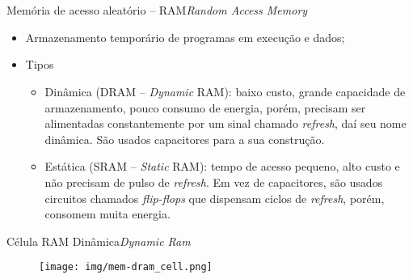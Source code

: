 \frame{\maketitle}

\section{\insertlecture}

\begin{frame}{Memória de acesso aleatório -- RAM}{\em Random Access
    Memory}
  \begin{itemize}
  \item Armazenamento temporário de programas em execução e dados;
  \item Tipos
    \begin{itemize}
    \item<1-> Dinâmica (DRAM -- {\em Dynamic} RAM): baixo custo, grande
      capacidade de armazenamento, pouco consumo de energia, porém,
      precisam ser alimentadas constantemente por um sinal chamado
      {\em refresh}, daí seu nome dinâmica. São usados capacitores
      para a sua construção.
    \item<2> Estática (SRAM -- {\em Static} RAM): tempo de acesso
      pequeno, alto custo e não precisam de pulso de {\em refresh}. Em vez
      de capacitores, são usados circuitos chamados {\em flip-flops}
      que dispensam ciclos de {\em refresh}, porém, consomem muita
      energia.  
    \end{itemize}
  \end{itemize}  
  
\end{frame}

\begin{frame}{Célula RAM Dinâmica}{{\em Dynamic Ram}}
\begin{figure}
\texttt{[image: img/mem-dram\_cell.png]}
\end{figure}
\end{frame}

